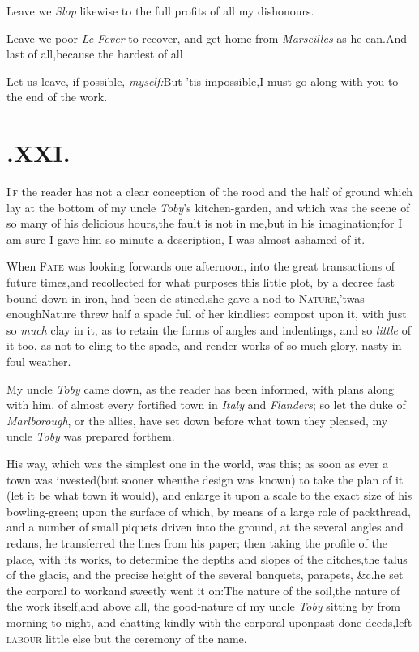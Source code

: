 \documentclass{article}
\begin{document}
Leave we \textit{Slop} likewise to the full profits of all my
dishonours.\tsh

Leave we poor \textit{Le Fever} to recover, and get home from
\textit{Marseilles} as he can.\break\tsh And last of
all,\tsk because the hardest of all\tsh

\newpage
Let us leave, if possible, \textit{myself:}\tsh But
’tis impossible,\tsk I must go along with you to the end of
the work.

\section{.\enspace XXI.}

\lettrine{I}{\,f} the reader has not a clear
conception of the rood and the half of ground which lay at the
bottom of my uncle \textit{Toby}’s kitchen-garden, and which
was the scene of so many of his delicious hours,\tsk the fault is
not in me,\tsk but in his imagination;\tsk for I am sure I gave
him so minute a description, I was almost ashamed of it.

When \textsc{Fate} was looking forwards one afternoon,
into the great transactions of future times,\tsk and recollected
for what purposes this little plot, by a decree fast bound down in
iron, had been de-\pb stined,\tsk she gave a nod to
\textsc{Nature},\tsk ’twas enough\tsk Nature threw
half a spade full of her kindliest compost upon it, with just so
\textit{much} clay in it, as to retain the forms of angles and
indentings,\tsk\break
and so \textit{little} of it too, as not to cling
to the spade, and render works of so much glory, nasty in foul
weather.

My uncle \textit{Toby} came down, as the reader has been informed,
with plans along with him, of almost every fortified town in
\textit{Italy} and \textit{Flanders}; so let the duke of
\textit{Marlborough}, or the allies, have set down before what town
they pleased, my uncle \textit{Toby} was prepared for\break them.

His way, which was the simplest one in the world, was this; as
soon as ever a town was invested\tsk (but sooner when\pb the design
was known) to take the plan of it (let it be what town it would),
and enlarge it upon a scale to the exact size of his bowling-green;
upon the surface of which, by means of a large role of packthread,
and a number of small piquets driven into the ground, at the
several angles and redans, he transferred the lines from his paper;
then taking the profile of the place, with its works, to determine
the depths and slopes of the ditches,\tsk the talus of the
glacis, and the precise height of the several banquets, parapets,
\&c.\tsk he set the corporal to work\tsh and sweetly went it
on:\tsh The nature of the soil,\tsk the nature of the
work itself,\tsk and above all, the good-nature of my uncle
\textit{Toby} sitting by from morning to night, and chatting kindly
with the corporal upon\pb past-done deeds,\tsk left
\textsc{labour} little else but the ceremony of the name.
\end{document}
